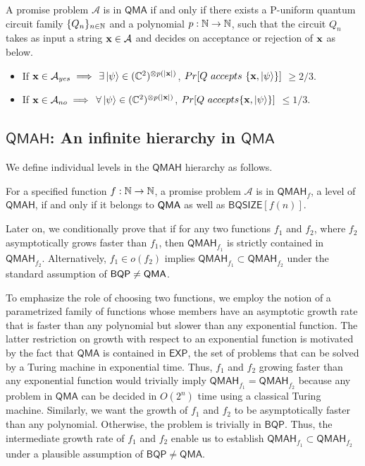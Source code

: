 \documentclass[11pt]{article}
\newcommand{\ms}[1]{\mathsf{#1}}
\begin{document}
\begin{definition}
     A promise problem $\mathcal{A}$ is in $\mathsf{QMA}$ if and only if there exists a P-uniform quantum circuit family $\{Q_n\}_{n\in \mathbb{N}}$ and a polynomial $p:\mathbb{N} \rightarrow \mathbb{N}$, such that the circuit $Q_n$ takes as input a string $\mathbf{x}\in \mathcal{A}$ and decides on acceptance or rejection of $\mathbf{x}$ as below.
    \begin{itemize}
        \item If $\mathbf{x}\in \mathcal{A}_{yes} \implies$ $\exists\ket{\psi}\in (\mathbb{C}^2)^{\otimes p(|\mathbf{x}|)}$, ${Pr[Q\ accepts\ \{\xx,\ket{\psi}\}]}$ $\geq 2/3$.
        \item If $\mathbf{x}\in \mathcal{A}_{no} \implies $ $\forall \ket{\psi}\in (\mathbb{C}^2)^{\otimes p(|\mathbf{x}|)}$, ${Pr[Q\ accepts \{\xx,\ket{\psi}\} ]}$ $\leq 1/3$.
    \end{itemize}
\end{definition}

\subsection{$\ms{QMAH}$: An infinite hierarchy in $\ms{QMA}$ }
We define individual levels in the $\ms{QMAH}$ hierarchy as follows.
\begin{definition}
    [$\ms{QMAH}_f$] For a specified function $f:\mathbb{N} \rightarrow\mathbb{N}$, a promise problem $\mathcal{A} $ is in $\ms{QMAH}_f$, a level of $\ms{QMAH}$, if and only if it belongs to $\mathsf{QMA}$ as well as $\ms{BQSIZE}[f(n)]$.
    \label{def: QMAH_f}
\end{definition}
Later on, we conditionally prove that if for any two functions $f_1$ and $f_2$, where $f_2$ asymptotically grows faster than $f_1$, then $\ms{QMAH}_{f_1}$ is strictly contained in $\ms{QMAH}_{f_2}$. Alternatively, $f_1\in o(f_2)$ implies $\ms{QMAH}_{f_1}\subset \ms{QMAH}_{f_2}$ under the standard assumption of $\mathsf{BQP} \neq \mathsf{QMA}$. \par
To emphasize the role of choosing two functions, we employ the notion of a parametrized family of functions whose members have an asymptotic growth rate that is faster than any polynomial but slower than any exponential function. The latter restriction on growth with respect to an exponential function is motivated by the fact that $\ms{QMA}$ is contained in $\mathsf{EXP}$, the set of problems that can be solved by a Turing machine in exponential time. Thus, $f_1$ and $f_2$ growing faster than any exponential function would trivially imply $\ms{QMAH}_{f_1}=\ms{QMAH}_{f_2}$ because any problem in $\ms{QMA}$ can be decided in $O(2^n)$ time using a classical Turing machine. Similarly, we want the growth of $f_1$ and $f_2$ to be asymptotically faster than any polynomial. Otherwise, the problem is trivially in $\ms{BQP}$. Thus, the intermediate growth rate of $f_1$ and $f_2$ enable us to establish $\ms{QMAH}_{f_1}\subset \ms{QMAH}_{f_2}$ under a plausible assumption of $\ms{BQP\neq QMA}$.
\end{document}
